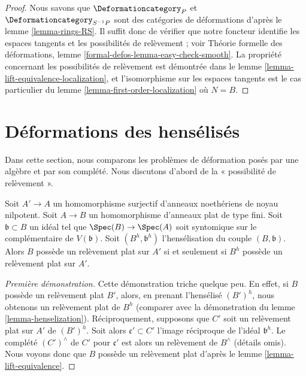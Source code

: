 \begin{proof}
Nous savons que $\Deformationcategory_P$ et $\Deformationcategory_{S^{-1}P}$
sont des catégories de déformations d'après le lemme \ref{lemma-rings-RS}.
Il suffit donc de vérifier que
notre foncteur identifie les espaces tangents et les possibilités
de relèvement ; voir Théorie formelle des déformations, lemme
\ref{formal-defos-lemma-easy-check-smooth}.
La propriété concernant les possibilités de relèvement est démontrée dans le
lemme \ref{lemma-lift-equivalence-localization},
et l'isomorphisme sur les espaces tangents est le cas particulier du
lemme \ref{lemma-first-order-localization} où $N = B$.
\end{proof}



\section{Déformations des hensélisés}
\label{section-compare-henselization}

\noindent
Dans cette section, nous comparons les problèmes de déformation posés
par une algèbre et par son complété.
Nous discutons d'abord de la « possibilité de relèvement ».

\begin{lemma}
\label{lemma-lift-equivalence-henselization}
Soit $A' \to A$ un homomorphisme surjectif d'anneaux noethériens de noyau nilpotent.
Soit $A \to B$ un homomorphisme d'anneaux plat de type fini.
Soit $\mathfrak b \subset B$ un idéal tel que
$\Spec(B) \to \Spec(A)$ soit syntomique sur le complémentaire de $V(\mathfrak b)$.
Soit $(B^h, \mathfrak b^h)$ l'hensélisation du couple $(B, \mathfrak b)$.
Alors $B$ possède un relèvement plat sur $A'$ si et seulement si $B^h$ possède un relèvement plat sur $A'$.
\end{lemma}

\begin{proof}[Première démonstration]
Cette démonstration triche quelque peu. En effet, si $B$ possède un relèvement plat $B'$, alors,
en prenant l'hensélisé $(B')^h$, nous obtenons un relèvement plat de $B^h$
(comparer avec la démonstration du lemme \ref{lemma-henselization}).
Réciproquement, supposons que $C'$ soit un relèvement plat sur $A'$ de $(B')^h$.
Soit alors $\mathfrak c' \subset C'$ l'image réciproque de
l'idéal $\mathfrak b^h$. Le complété $(C')^\wedge$ de
$C'$ pour $\mathfrak c'$ est alors un relèvement de $B^\wedge$ (détails omis).
Nous voyons donc que $B$ possède un relèvement plat d'après le
lemme \ref{lemma-lift-equivalence}.
\end{proof}

